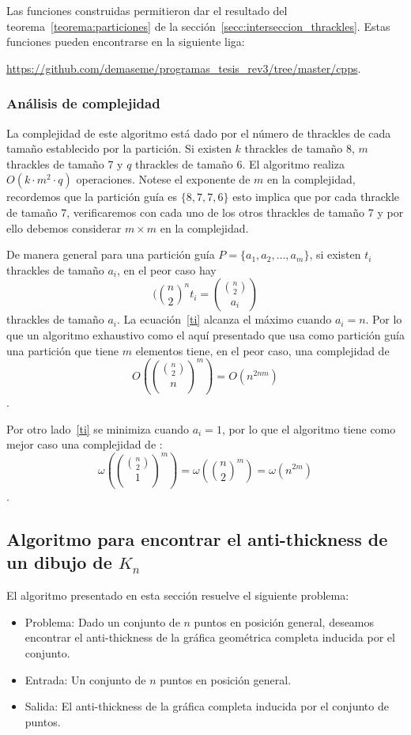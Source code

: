   Las funciones construidas permitieron dar el resultado del
  teorema~\ref{teorema:particiones} de la sección~\ref{secc:interseccion_thrackles}.
  Estas funciones pueden encontrarse en la siguiente liga:

  \url{https://github.com/demaseme/programas_tesis_rev3/tree/master/cpps}.

  \subsubsection{Análisis de complejidad}
  La complejidad de este algoritmo está dado por el número de thrackles de cada
  tamaño establecido por la partición. Si existen $k$ thrackles de tamaño 8, $m$
  thrackles de tamaño 7 y $q$ thrackles de tamaño 6. El algoritmo realiza $O(k\cdot
  m^2 \cdot q)$ operaciones. Notese el exponente de $m$ en la complejidad, recordemos que
  la partición guía es $\{8,7,7,6\}$ esto implica que por cada thrackle de tamaño 7, verificaremos
  con cada uno de los otros thrackles de tamaño 7 y por ello debemos considerar $m\times m$ en la
  complejidad.

  De manera general para una partición guía $P=\{a_1,a_2,\dots,a_m\}$, si existen $t_i$
  thrackles de tamaño $a_i$, en el peor caso hay
  \begin{equation} \label{ti}(\binom{n}{2}^n
    t_i=\displaystyle \binom{\binom{n}{2}}{a_i}
  \end{equation}
  thrackles de tamaño $a_i$. La ecuación~\ref{ti} alcanza el máximo cuando $a_i=n$. Por lo que
  un algoritmo exhaustivo como el aquí presentado que usa como partición guía una partición que tiene $m$
  elementos tiene, en el peor caso, una complejidad de
  \[O\left(\binom{\binom{n}{2}}{n}^m\right) = O(n^{2nm}) \].

  Por otro lado~\ref{ti} se minimiza cuando $a_i=1$, por lo que el algoritmo tiene como mejor caso una complejidad de :
  \[\omega\left(\binom{\binom{n}{2}}{1}^m\right)= \omega\left( \binom{n}{2}^m\right) = \omega(n^{2m})\].

\subsection{Algoritmo para encontrar el anti-thickness de un dibujo de
$K_n$}\label{secc:anti-thickness-dibujo}

  El algoritmo presentado en esta sección resuelve el siguiente problema:
  \begin{itemize}
    \item[] Problema: Dado un conjunto de $n$ puntos en posición general, deseamos encontrar el
    anti-thickness de la gráfica geométrica completa inducida por el conjunto.
    \item[] Entrada: Un conjunto de $n$ puntos en posición general.
    \item[] Salida: El anti-thickness de la gráfica completa inducida por el conjunto de puntos.
  \end{itemize}

